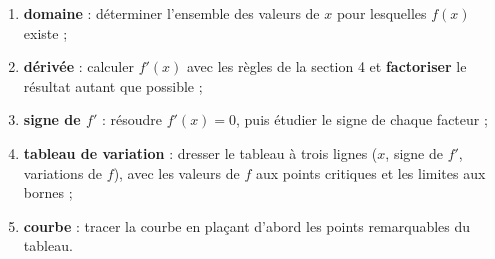 \begin{methode}
\begin{enumerate}
\item \textbf{domaine} : déterminer l'ensemble des valeurs de $x$ pour lesquelles $f(x)$ existe ;
\item \textbf{dérivée} : calculer $f'(x)$ avec les règles de la section 4 et \textbf{factoriser} le résultat autant que possible ;
\item \textbf{signe de $f'$} : résoudre $f'(x) = 0$, puis étudier le signe de chaque facteur ;
\item \textbf{tableau de variation} : dresser le tableau à trois lignes ($x$, signe de $f'$, variations de $f$), avec les valeurs de $f$ aux points critiques et les limites aux bornes ;
\item \textbf{courbe} : tracer la courbe en plaçant d'abord les points remarquables du tableau.
\end{enumerate}
\end{methode}

